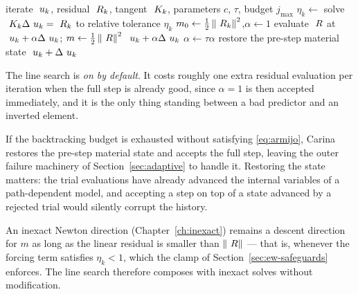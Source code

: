 \begin{algorithm}[h]
\caption{Newton step with Armijo backtracking}
\label{alg:newton}
\begin{algorithmic}[1]
  \Require iterate $~u_k$, residual $~R_k$, tangent $~K_k$,
           parameters $c$, $\tau$, budget $j_{\max}$
  \State $\eta_k \gets$ 
  \State solve $~K_k \Delta~u_k = ~R_k$ to relative tolerance $\eta_k$
  \State $m_0 \gets \tfrac12\left\lVert ~R_k \right\rVert^2$,\quad $\alpha \gets 1$
    \State evaluate $~R$ at $~u_k + \alpha\Delta~u_k$;\quad
           $m \gets \tfrac12\left\lVert ~R \right\rVert^2$
      \State \Return $~u_k + \alpha\Delta~u_k$
    \EndIf
    \State $\alpha \gets \tau\alpha$
  \EndFor
  \State restore the pre-step material state
  \State \Return $~u_k + \Delta~u_k$
\end{algorithmic}
\end{algorithm}

The line search is \emph{on by default}.  It costs roughly one extra residual
evaluation per iteration when the full step is already good, since $\alpha = 1$
is then accepted immediately, and it is the only thing standing between a bad
predictor and an inverted element.

\begin{remark}
\label{rem:restore}
If the backtracking budget is exhausted without satisfying
\eqref{eq:armijo}, Carina restores the pre-step material state and accepts the
full step, leaving the outer failure machinery of Section~\ref{sec:adaptive} to
handle it.  Restoring the state matters: the trial evaluations have already
advanced the internal variables of a path-dependent model, and accepting a step
on top of a state advanced by a rejected trial would silently corrupt the
history.
\end{remark}

\begin{remark}
An inexact Newton direction (Chapter~\ref{ch:inexact}) remains a descent
direction for $m$ as long as the linear residual is smaller than $\left\lVert ~R \right\rVert$
--- that is, whenever the forcing term satisfies $\eta_k < 1$, which the clamp
of Section~\ref{sec:ew-safeguards} enforces.  The line search therefore
composes with inexact solves without modification.
\end{remark}

